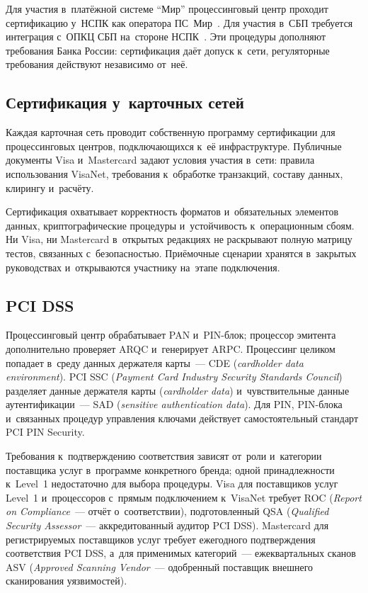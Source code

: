 Для участия в~платёжной системе \enquote{Мир} процессинговый центр
проходит сертификацию у~НСПК как оператора ПС~Мир~\cite{nspk-mir-rules}. Для участия в~СБП требуется интеграция с~ОПКЦ СБП
на~стороне НСПК~\cite{cbr-sbp-rules}. Эти процедуры дополняют требования
Банка России: сертификация даёт допуск к~сети, регуляторные требования
действуют независимо от~неё.

\subsection*{Сертификация у~карточных сетей}

Каждая карточная сеть проводит собственную программу сертификации для
процессинговых центров, подключающихся к~её инфраструктуре. Публичные документы
Visa и~Mastercard задают условия участия в~сети: правила использования VisaNet,
требования к~обработке транзакций, составу данных, клирингу
и~расчёту.~\cite{visa-core-rules,mc-rules,mc-tpr}

Сертификация охватывает корректность форматов и~обязательных элементов данных,
криптографические процедуры и~устойчивость к~операционным сбоям. Ни Visa, ни
Mastercard в~открытых редакциях не раскрывают полную матрицу тестов, связанных
с~безопасностью. Приёмочные сценарии хранятся в~закрытых руководствах
и~открываются участнику на~этапе
подключения.~\cite{visa-core-rules,mc-rules}

\subsection*{PCI DSS}

Процессинговый центр обрабатывает PAN и~PIN-блок; процессор эмитента
дополнительно проверяет ARQC и~генерирует ARPC. Процессинг целиком попадает
в~среду данных держателя карты~--- CDE (\textit{cardholder data environment}).
PCI SSC (\textit{Payment Card Industry Security Standards Council}) разделяет
данные держателя карты (\textit{cardholder data}) и~чувствительные данные
аутентификации~--- SAD (\textit{sensitive authentication data}). Для PIN,
PIN-блока и~связанных процедур управления ключами действует самостоятельный
стандарт PCI PIN
Security.~\cite{pci-pin-security,pci-scoping-guidance,pci-faq-1335}

Требования к~подтверждению соответствия зависят от~роли и~категории поставщика
услуг в~программе конкретного бренда; одной принадлежности к~Level~1
недостаточно для выбора процедуры. Visa для поставщиков услуг Level~1
и~процессоров с~прямым подключением к~VisaNet требует ROC
(\textit{Report on Compliance}~--- отчёт
о~соответствии),
подготовленный QSA (\textit{Qualified Security Assessor}~--- аккредитованный
аудитор PCI DSS). Mastercard для регистрируемых поставщиков услуг требует
ежегодного подтверждения соответствия PCI DSS, а~для применимых категорий~---
ежеквартальных сканов ASV (\textit{Approved Scanning Vendor}~--- одобренный
поставщик внешнего сканирования уязвимостей).~\cite{visa-pci-validation-best-practice,mc-service-provider-categories-pci,pci-faq-1234-asv}


